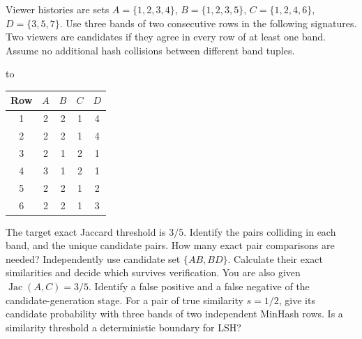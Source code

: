 \documentclass[10pt,a4paper,twocolumn]{article}
\newenvironment{examtable}[1]{%
  \par\addvspace{2pt}\noindent\hbox to \linewidth\bgroup\hfil
  \setlength{\tabcolsep}{4pt}%
  \renewcommand{\arraystretch}{1.12}\begin{tabular}{#1}%
}{\end{tabular}\hfil\egroup\par\addvspace{2pt}}
\begin{document}
Viewer histories are sets $A=\{1,2,3,4\}$, $B=\{1,2,3,5\}$, $C=\{1,2,4,6\}$, $D=\{3,5,7\}$. Use three bands of two consecutive rows in the following signatures. Two viewers are candidates if they agree in every row of at least one band. Assume no additional hash collisions between different band tuples.
\begin{examtable}{@{}ccccc@{}}
\toprule
Row & $A$ & $B$ & $C$ & $D$\\
\midrule
1 & 2 & 2 & 1 & 4\\
2 & 2 & 2 & 1 & 4\\
3 & 2 & 1 & 2 & 1\\
4 & 3 & 1 & 2 & 1\\
5 & 2 & 2 & 1 & 2\\
6 & 2 & 2 & 1 & 3\\
\bottomrule
\end{examtable}
The target exact Jaccard threshold is $3/5$.
 Identify the pairs colliding in each band, and the unique candidate pairs. How many exact pair comparisons are needed?
 Independently use candidate set $\{AB,BD\}$. Calculate their exact similarities and decide which survives verification. You are also given $\operatorname{Jac}(A,C)=3/5$. Identify a false positive and a false negative of the candidate-generation stage.
 For a pair of true similarity $s=1/2$, give its candidate probability with three bands of two independent MinHash rows. Is a similarity threshold a deterministic boundary for LSH?
\end{document}
